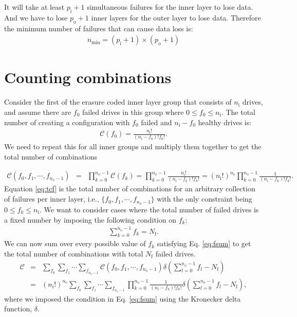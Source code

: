 \documentclass[journal]{IEEEtran}
\begin{document}
It will take at least \(p_\text{i}+1\) simultaneous failures for the inner layer to lose data. And we have to lose \(p_\text{o}+1\) inner layers for the outer layer to lose data. Therefore the minimum number of failures that can cause data loss is:
\begin{eqnarray}
n_\text{min}=(p_\text{i}+1)\times (p_\text{o}+1)
\label{eq:nmindef}
\end{eqnarray}

\hypertarget{counting-combinations}{%
\section{Counting combinations}\label{counting-combinations}}

Consider the first of the erasure coded inner layer group that consists of \(n_\text{i}\) drives, and assume there are \(f_0\) failed drives in this group where \(0\leq f_0\leq n_\text{i}\). The total number of creating a configuration with \(f_0\) failed and \(n_\text{i}-f_0\) healthy drives is:
\begin{eqnarray}
\mathcal{C}(f_0)=\frac{n_\text{i}!}{(n_\text{i}-f_0)!f_0!} .
\label{eq:pb0}
\end{eqnarray}
We need to repeat this for all inner groups and multiply them together to get the total number of combinations

\begin{eqnarray}
\mathcal{C}(f_0,f_1,\cdots, f_{n_\text{o}-1})&=& {\displaystyle \prod_{k=0}^{n_\text{o}-1}} \mathcal{C}(f_k)={\displaystyle \prod_{k=0}^{n_\text{o}-1}} \frac{n_\text{i}!}{(n_\text{i}-f_k)!f_k!}
=\left(n_\text{i}!\right)^{n_\text{o}}{\displaystyle \prod_{k=0}^{n_\text{o}-1}} \frac{1}{(n_\text{i}-f_k)!f_k!}.
\label{eq:tcf}
\end{eqnarray}
Equation \eqref{eq:tcf} is the total number of combinations for an arbitrary collection of failures per inner layer, i.e., \(\{f_0,f_1,\cdots, f_{n_\text{o}-1}\}\) with the only constraint being \(0\leq f_k\leq n_\text{i}\). We want to consider cases where the total number of failed drives is a fixed number by imposing the following condition on \(f_k\):
\begin{eqnarray}
 \sum_{k=0}^{n_\text{o}-1}f_k= N_\text{f}.
\label{eq:fsum}
\end{eqnarray}
We can now sum over every possible value of \(f_k\) satisfying Eq. \eqref{eq:fsum} to get the total number of combinations with total \(N_\text{f}\) failed drives.
\begin{eqnarray}
\mathcal{C}&=& \sum_{f_0}\sum_{f_1}\cdots \sum_{f_{n_\text{o}-1}} \mathcal{C}(f_0,f_1,\cdots, f_{n_\text{o}-1}) \delta\left(  \sum_{l=0}^{n_\text{o}-1}f_l- N_\text{f}\right)\nonumber\\
&=& \left(n_\text{i}!\right)^{n_\text{o}}  \sum_{f_0}\sum_{f_1}\cdots \sum_{f_{n_\text{o}-1}} {\displaystyle \prod_{k=0}^{n_\text{o}-1}} \frac{1}{(n_\text{i}-f_k)!f_k!} \delta\left(  \sum_{l=0}^{n_\text{o}-1}f_l- N_\text{f}\right),
\label{eq:tcfs}
\end{eqnarray}
where we imposed the condition in Eq. \eqref{eq:fsum} using the Kronecker delta function, \(\delta\).
\end{document}
